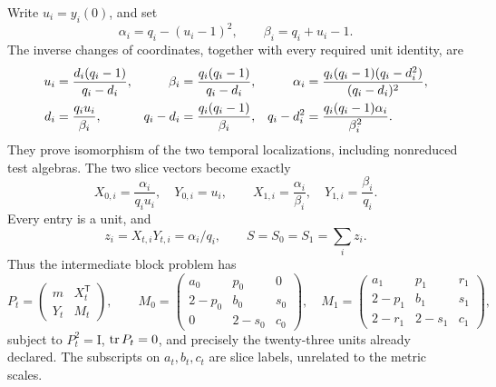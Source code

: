 \documentclass[11pt,a4paper]{article}
\theoremstyle{remark}\newtheorem{remark}[theorem]{Remark}
\newcommand{\Id}{\mathrm I}\newcommand{\F}{\mathbb F}
\begin{document}
Write \(u_i=y_i(0)\), and set
\[
 \alpha_i=q_i-(u_i-1)^2,\qquad \beta_i=q_i+u_i-1.
\]
The inverse changes of coordinates, together with every required unit
identity, are
\begin{align}
 u_i&=\frac{d_i(q_i-1)}{q_i-d_i},&
 \beta_i&=\frac{q_i(q_i-1)}{q_i-d_i},&
 \alpha_i&=\frac{q_i(q_i-1)(q_i-d_i^2)}{(q_i-d_i)^2},\notag\\
 d_i&=\frac{q_iu_i}{\beta_i},&
 q_i-d_i&=\frac{q_i(q_i-1)}{\beta_i},&
 q_i-d_i^2&=\frac{q_i(q_i-1)\alpha_i}{\beta_i^2}.
 \label{geometry:chartinverse}
\end{align}
They prove isomorphism of the two temporal localizations, including
nonreduced test algebras. The two slice vectors become exactly
\begin{equation}\label{geometry:XY}
 X_{0,i}=\frac{\alpha_i}{q_iu_i},\quad Y_{0,i}=u_i,
 \qquad
 X_{1,i}=\frac{\alpha_i}{\beta_i},\quad Y_{1,i}=\frac{\beta_i}{q_i}.
\end{equation}
Every entry is a unit, and
\[
 z_i=X_{t,i}Y_{t,i}=\alpha_i/q_i,\qquad S=S_0=S_1=\sum_i z_i.
\]
Thus the intermediate block problem has
\[
 P_t=\begin{pmatrix}m&X_t^{\mathsf T}\\Y_t&M_t\end{pmatrix},\qquad
 M_0=\begin{pmatrix}a_0&p_0&0\\2-p_0&b_0&s_0\\0&2-s_0&c_0\end{pmatrix},
\quad
 M_1=\begin{pmatrix}a_1&p_1&r_1\\2-p_1&b_1&s_1\\2-r_1&2-s_1&c_1\end{pmatrix},
\]
subject to \(P_t^2=\Id\), \(\operatorname{tr} P_t=0\), and precisely the
twenty-three units already declared. The subscripts on \(a_t,b_t,c_t\)
are slice labels, unrelated to the metric scales.
\end{document}
